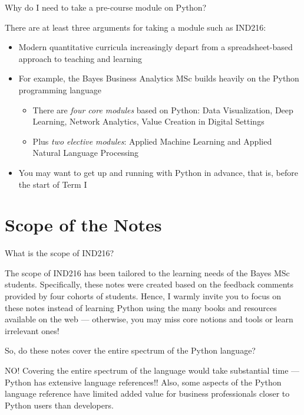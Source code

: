 \documentclass[a4paper,11pt]{book}
\newcommand{\question}[1]{%
    \begin{tcolorbox}[colback=comp_c!10,colframe=comp_c,sidebyside align=top,width=\linewidth,before skip=1ex]
        #1
    \end{tcolorbox}
    \switchcolumn%
}
\newcommand{\note}[1]{%
    \begin{tcolorbox}[colback=white!0,colframe=white!10,width=\linewidth,before skip=1ex]
        #1
    \end{tcolorbox}
}
\begin{document}
\begin{paracol}{2}
	\question{\raggedright Why do I need to take a pre-course module on Python?}
        \note{
	There are at least three arguments for taking a module such as IND216:
	\begin{itemize}
		\item Modern quantitative curricula increasingly depart from a spreadsheet-based approach to teaching and learning
		\item For example, the Bayes Business Analytics MSc builds heavily on the Python programming language
		\begin{itemize}
			\item There are \emph{four core modules} based on Python: Data Visualization, Deep Learning, Network Analytics, Value Creation in Digital Settings
			\item Plus \emph{two elective modules}: Applied Machine Learning and Applied Natural Language Processing
		\end{itemize}
		\item You may want to get up and running with Python in advance, that is, before the start of Term I
	\end{itemize}
	}
\end{paracol}

\section{Scope of the Notes}

\begin{paracol}{2}
	\question{\raggedright What is the scope of IND216?}
	\note{The scope of IND216 has been tailored to the learning needs of the Bayes MSc students. Specifically, these notes were created based on the feedback comments provided by four cohorts of students. Hence, I warmly invite you to focus on these notes instead of learning Python using the many books and resources available on the web --- otherwise, you may miss core notions and tools or learn irrelevant ones!
	}
\end{paracol}
\clearpage

\begin{paracol}{2}
	\question{\raggedright So, do these notes cover the entire spectrum of the Python language?}	
	\note{NO! Covering the entire spectrum of the language would take substantial time --- Python has extensive language references!! Also, some aspects of the Python language reference have limited added value for business professionals closer to Python users than developers.
	}
\end{paracol}
\end{document}
